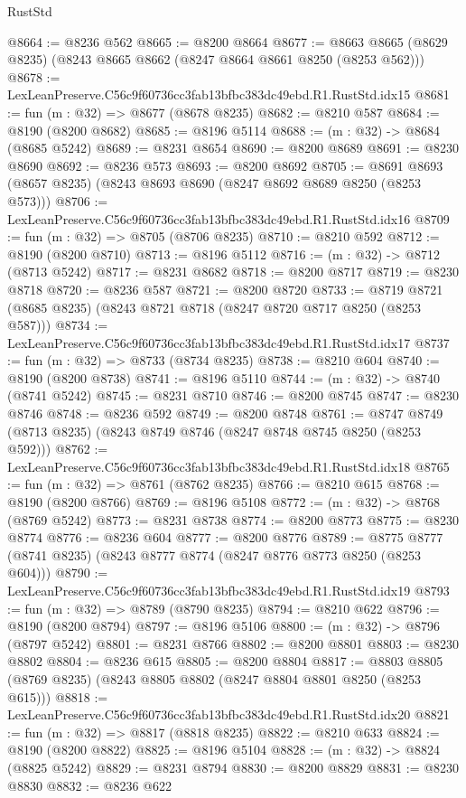 \begin{lexlean}{RustStd}
\begin{coremodule}
@8664 := @8236 @562
@8665 := @8200 @8664
@8677 := @8663 @8665 (@8629 @8235) (@8243 @8665 @8662 (@8247 @8664 @8661 @8250 (@8253 @562)))
@8678 := LexLeanPreserve.C56c9f60736cc3fab13bfbc383dc49ebd.R1.RustStd.idx15
@8681 := fun (m : @32) => @8677 (@8678 @8235)
@8682 := @8210 @587
@8684 := @8190 (@8200 @8682)
@8685 := @8196 @5114
@8688 := (m : @32) -> @8684 (@8685 @5242)
@8689 := @8231 @8654
@8690 := @8200 @8689
@8691 := @8230 @8690
@8692 := @8236 @573
@8693 := @8200 @8692
@8705 := @8691 @8693 (@8657 @8235) (@8243 @8693 @8690 (@8247 @8692 @8689 @8250 (@8253 @573)))
@8706 := LexLeanPreserve.C56c9f60736cc3fab13bfbc383dc49ebd.R1.RustStd.idx16
@8709 := fun (m : @32) => @8705 (@8706 @8235)
@8710 := @8210 @592
@8712 := @8190 (@8200 @8710)
@8713 := @8196 @5112
@8716 := (m : @32) -> @8712 (@8713 @5242)
@8717 := @8231 @8682
@8718 := @8200 @8717
@8719 := @8230 @8718
@8720 := @8236 @587
@8721 := @8200 @8720
@8733 := @8719 @8721 (@8685 @8235) (@8243 @8721 @8718 (@8247 @8720 @8717 @8250 (@8253 @587)))
@8734 := LexLeanPreserve.C56c9f60736cc3fab13bfbc383dc49ebd.R1.RustStd.idx17
@8737 := fun (m : @32) => @8733 (@8734 @8235)
@8738 := @8210 @604
@8740 := @8190 (@8200 @8738)
@8741 := @8196 @5110
@8744 := (m : @32) -> @8740 (@8741 @5242)
@8745 := @8231 @8710
@8746 := @8200 @8745
@8747 := @8230 @8746
@8748 := @8236 @592
@8749 := @8200 @8748
@8761 := @8747 @8749 (@8713 @8235) (@8243 @8749 @8746 (@8247 @8748 @8745 @8250 (@8253 @592)))
@8762 := LexLeanPreserve.C56c9f60736cc3fab13bfbc383dc49ebd.R1.RustStd.idx18
@8765 := fun (m : @32) => @8761 (@8762 @8235)
@8766 := @8210 @615
@8768 := @8190 (@8200 @8766)
@8769 := @8196 @5108
@8772 := (m : @32) -> @8768 (@8769 @5242)
@8773 := @8231 @8738
@8774 := @8200 @8773
@8775 := @8230 @8774
@8776 := @8236 @604
@8777 := @8200 @8776
@8789 := @8775 @8777 (@8741 @8235) (@8243 @8777 @8774 (@8247 @8776 @8773 @8250 (@8253 @604)))
@8790 := LexLeanPreserve.C56c9f60736cc3fab13bfbc383dc49ebd.R1.RustStd.idx19
@8793 := fun (m : @32) => @8789 (@8790 @8235)
@8794 := @8210 @622
@8796 := @8190 (@8200 @8794)
@8797 := @8196 @5106
@8800 := (m : @32) -> @8796 (@8797 @5242)
@8801 := @8231 @8766
@8802 := @8200 @8801
@8803 := @8230 @8802
@8804 := @8236 @615
@8805 := @8200 @8804
@8817 := @8803 @8805 (@8769 @8235) (@8243 @8805 @8802 (@8247 @8804 @8801 @8250 (@8253 @615)))
@8818 := LexLeanPreserve.C56c9f60736cc3fab13bfbc383dc49ebd.R1.RustStd.idx20
@8821 := fun (m : @32) => @8817 (@8818 @8235)
@8822 := @8210 @633
@8824 := @8190 (@8200 @8822)
@8825 := @8196 @5104
@8828 := (m : @32) -> @8824 (@8825 @5242)
@8829 := @8231 @8794
@8830 := @8200 @8829
@8831 := @8230 @8830
@8832 := @8236 @622

\end{coremodule}
\end{lexlean}
